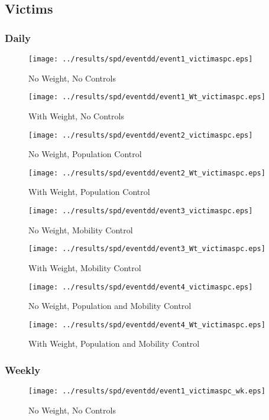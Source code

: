 \documentclass[11pt,letterpaper]{article}
\begin{document}
	\subsection{Victims}
		\subsubsection{Daily}
\begin{figure}[H]
\caption{No Weight, No Controls}
\centering
\texttt{[image: ../results/spd/eventdd/event1\_victimaspc.eps]}
\end{figure}

\begin{figure}[H]
\caption{With Weight, No Controls}
\centering
\texttt{[image: ../results/spd/eventdd/event1\_Wt\_victimaspc.eps]}
\end{figure}
\begin{figure}[H]
\caption{No Weight, Population Control}
\centering
\texttt{[image: ../results/spd/eventdd/event2\_victimaspc.eps]}
\end{figure}

\begin{figure}[H]
\caption{With Weight, Population Control}
\centering
\texttt{[image: ../results/spd/eventdd/event2\_Wt\_victimaspc.eps]}
\end{figure}
\begin{figure}[H]
\caption{No Weight, Mobility Control}
\centering
\texttt{[image: ../results/spd/eventdd/event3\_victimaspc.eps]}
\end{figure}

\begin{figure}[H]
\caption{With Weight, Mobility Control}
\centering
\texttt{[image: ../results/spd/eventdd/event3\_Wt\_victimaspc.eps]}
\end{figure}
\begin{figure}[H]
\caption{No Weight, Population and Mobility Control}
\centering
\texttt{[image: ../results/spd/eventdd/event4\_victimaspc.eps]}
\end{figure}

\begin{figure}[H]
\caption{With Weight, Population and Mobility Control}
\centering
\texttt{[image: ../results/spd/eventdd/event4\_Wt\_victimaspc.eps]}
\end{figure}

		\subsubsection{Weekly}
\begin{figure}[H]
\caption{No Weight, No Controls}
\centering
\texttt{[image: ../results/spd/eventdd/event1\_victimaspc\_wk.eps]}
\end{figure}
\end{document}
